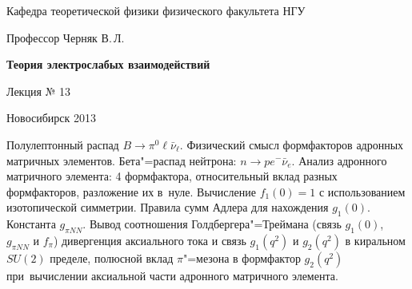 \documentclass[12pt,pagesize,paper=landscape,paper=192mm:108mm]{scrbook}
\begin{document}
\begin{titlepage}
\begin{center}
    Кафедра теоретической физики физического факультета НГУ
    \medskip

    \Large
    Профессор Черняк В.\,Л.
    \bigskip

    \huge
    \textbf{Теория электрослабых взаимодействий}
    \bigskip

    \Large
    Лекция № 13
    \vfill

\normalsize    Новосибирск 2013
  \smallskip

  \ccbysa
  \end{center}
\end{titlepage}
\newpage

\vspace*{-1em}
\begin{center}
 \vfill
  \begin{minipage}{0.66\linewidth}
    Полулептонный распад $B\to\pi^0\ell\bar{\nu}_{\ell}$.  Физический
    смысл формфакторов адронных матричных элементов. Бета"=распад
    нейтрона: $n\to p e^-\bar{\nu}_e$.  Анализ адронного матричного
    элемента: 4 формфактора, относительный вклад разных формфакторов,
    разложение их в~нуле.  Вычисление $f_1(0)=1$ с использованием
    изотопической симметрии.  Правила сумм Адлера для нахождения
    $g_1(0)$. Константа $g_{\pi NN}$.  Вывод соотношения
    Голдбергера"=Треймана (связь $g_1(0)$, $g_{\pi NN}$ и $f_{\pi}$)
    дивергенция аксиального тока и связь $g_1(q^2)$ и $g_2(q^2)$ в
    киральном $SU(2)$ пределе, полюсной вклад $\pi$"=мезона в
    формфактор $g_2(q^2)$ при~вычислении аксиальной части адронного
    матричного элемента.
  \end{minipage}
  \vfill

\end{center}
\end{document}
